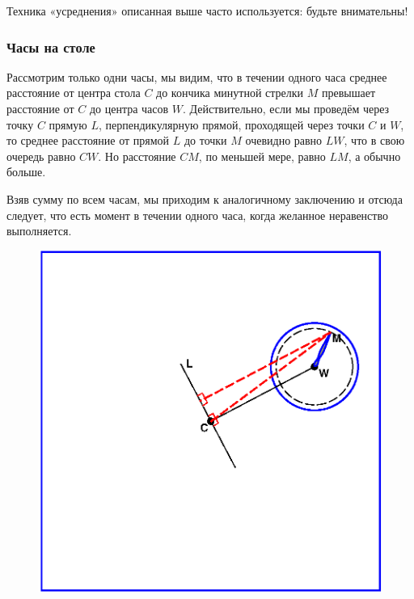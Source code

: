 
Техника «усреднения» описанная выше часто используется: будьте внимательны!

\subsubsection*{Часы на столе} %

Рассмотрим только одни часы, 
мы видим, что в течении одного часа среднее расстояние от центра стола $C$ до кончика минутной стрелки $M$ превышает расстояние от $C$ до центра часов $W$.
Действительно, если мы проведём через точку $C$ прямую $L$, перпендикулярную прямой, проходящей через точки $C$ и $W$, 
то среднее расстояние от прямой $L$ до точки $M$ очевидно равно $LW$, 
что в свою очередь равно $CW$.
Но расстояние $CM$, по меньшей мере, равно $LM$, а обычно больше.

Взяв сумму по всем часам, мы приходим к аналогичному заключению и отсюда следует, что есть момент в течении одного часа, когда желанное неравенство выполняется.\heart

\begin{figure}[h!]
\centering
\includegraphics[scale=0.6]{Figs/Insight/watch}
\end{figure}

